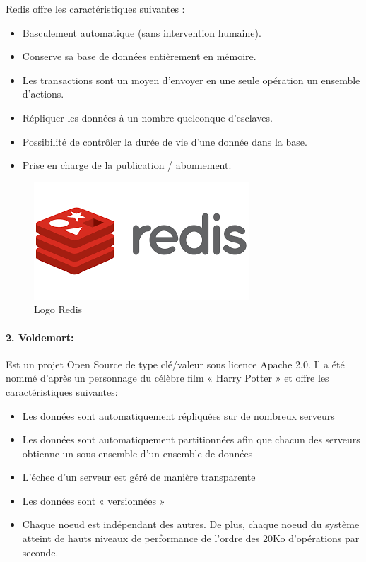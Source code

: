 Redis offre les caractéristiques suivantes :
\begin{itemize}[label=]
\item Basculement automatique (sans intervention humaine).
\item Conserve sa base de données entièrement en mémoire.
\item Les transactions sont un moyen d'envoyer en une seule opération un ensemble d'actions.
\item Répliquer les données à un nombre quelconque d'esclaves.
\item Possibilité de contrôler la durée de vie d'une donnée dans la base.
\item Prise en charge de la publication / abonnement.
\end{itemize}
\begin{figure}[h]
	\centering
    \includegraphics[scale=0.4]{img/4.7}
    \caption{Logo Redis}
\end{figure}
\paragraph{2. Voldemort:}
Est un projet Open Source de type clé/valeur sous licence Apache 2.0. Il a été nommé d’après un personnage du célèbre film « Harry Potter » et offre les caractéristiques suivantes:

\begin{itemize}[label=]
\item Les données sont automatiquement répliquées sur de nombreux serveurs
\item Les données sont automatiquement partitionnées afin que chacun des serveurs obtienne un sous-ensemble d’un ensemble de données
\item L’échec d’un serveur est géré de manière transparente
\item Les données sont « versionnées »
\item Chaque noeud est indépendant des autres. De plus, chaque noeud du système atteint de hauts niveaux de performance de l’ordre des 20Ko d’opérations par seconde.
\end{itemize}

